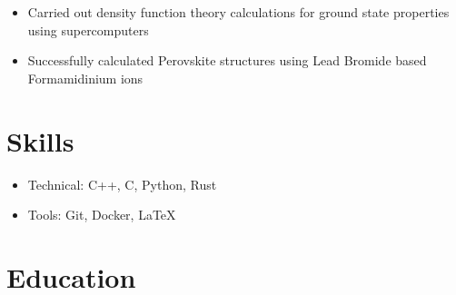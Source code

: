 \documentclass{Custom_CV}
\begin{document}
\begin{itemize}[rightmargin=\dimexpr\linewidth-15cm-\leftmargin\relax,noitemsep]
\item Carried out density function theory calculations for ground state properties using supercomputers
\item Successfully calculated Perovskite structures using Lead Bromide based Formamidinium ions
\end{itemize}
\section{Skills}

\begin{itemize}[noitemsep]
\item Technical: C++, C, Python, Rust
\item Tools: Git, Docker, \LaTeX
\end{itemize}

\section{Education}






\end{document}
